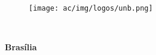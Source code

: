 \begin{titlepage}
\begin{center}

\begin{figure}[h!]
	\centering
			\texttt{[image: ac/img/logos/unb.png]}
	\label{fig:unb}
\end{figure}

{
	\bf \unb \\ 
	\bf \dep }
	\vspace{5cm
}

\setcounter{page}{0}
\null
\textbf{\titulo}
\vspace{2.5cm}

\vspace{0.2cm}
\textbf{\dicname}
\end{center}
\vspace{1.5cm}


\vspace{6cm}
\begin{center}
	{
		\bf{Brasília} \\ 
	}
	\bf{\ano}
\end{center}

\end{titlepage}
